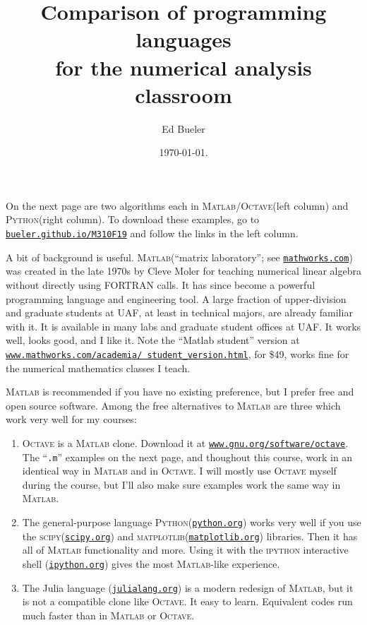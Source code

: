 \documentclass[11pt]{amsart}
\newcommand{\Matlab}{\textsc{Matlab}\xspace}
\newcommand{\Octave}{\textsc{Octave}\xspace}
\newcommand{\Python}{\textsc{Python}\xspace}
\newcommand{\scipy}{\textsc{scipy}\xspace}
\newcommand{\matplotlib}{\textsc{matplotlib}\xspace}
\begin{document}
\title{Comparison of programming languages \\ for the numerical analysis classroom}

\author{Ed Bueler}

\date{\today.}

\maketitle
\normalsize
\thispagestyle{empty}

\newcommand{\hrf}[2]{\href{#1}{\texttt{#2}}}

On the next page are two algorithms each in \Matlab/\Octave (left column) and \Python (right column).  To download these examples, go to \hrf{http://bueler.github.io/M310F19}{bueler.github.io/M310F19} and follow the links in the left column.

A bit of background is useful.  \Matlab (``matrix laboratory''; see \hrf{http://www.mathworks.com/}{mathworks.com}) was created in the late 1970s by Cleve Moler for teaching numerical linear algebra without directly using FORTRAN calls.  It has since become a powerful programming language and engineering tool.  A large fraction of upper-division and graduate students at UAF, at least in technical majors, are already familiar with it.  It is available in many labs and graduate student offices at UAF.  It works well, looks good, and I like it.  Note the ``Matlab student'' version at \hrf{https://www.mathworks.com/academia/student_version.html}{\texttt{www.mathworks.com/academia/ student\_version.html}}, for \$49, works fine for the numerical mathematics classes I teach.

\Matlab is recommended if you have no existing preference, but I prefer free and open source software.  Among the free alternatives to \Matlab are three which work very well for my courses:
\renewcommand{\labelenumi}{\arabic{enumi}.}
\begin{enumerate}
\item \Octave is a \Matlab clone.  Download it at
\hrf{http://www.gnu.org/software/octave/}{www.gnu.org/software/octave}.  The ``\texttt{.m}'' examples on the next page, and thoughout this course, work in an identical way in \Matlab and in \Octave.  I will mostly use \Octave myself during the course, but I'll also make sure examples work the same way in \Matlab.
\item The general-purpose language \Python (\hrf{http://python.org/}{python.org}) works very well if you use the \scipy (\hrf{http://www.scipy.org/}{scipy.org}) and \matplotlib (\hrf{http://matplotlib.org/}{matplotlib.org}) libraries.  Then it has all of \Matlab functionality and more.  Using it with the \textsc{ipython} interactive shell (\hrf{http://ipython.org/}{ipython.org}) gives the most \Matlab-like experience.
\item The Julia language (\hrf{https://julialang.org/}{julialang.org}) is a modern redesign of \Matlab, but it is not a compatible clone like \Octave.  It easy to learn.  Equivalent codes run much faster than in \Matlab or \Octave.
\end{enumerate}
\end{document}

